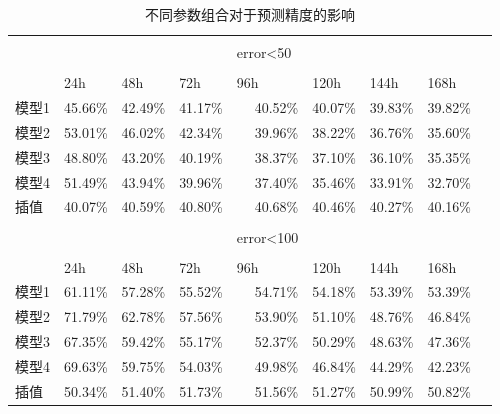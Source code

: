 \begin{table}[htbp]
  \centering
  \caption{不同参数组合对于预测精度的影响}
    \begin{tabular}{rrrrrrrrr}
    \hline \\
           &       &       &       &\multicolumn{1}{l}{error<50} &       &       &       &  \\\\
           \hline
          & \multicolumn{1}{l}{24h} & \multicolumn{1}{l}{48h} & \multicolumn{1}{l}{72h} & \multicolumn{1}{l}{96h} & \multicolumn{1}{l}{120h} & \multicolumn{1}{l}{144h} & \multicolumn{1}{l}{168h} &  \\
          \hline
    \multicolumn{1}{l}{模型1} & 45.66\% & 42.49\% & 41.17\% & 40.52\%  & 40.07\% & 39.83\% & 39.82\% &  \\
    \multicolumn{1}{l}{模型2} & 53.01\% & 46.02\% & 42.34\% & 39.96\% & 38.22\% & 36.76\% & 35.60\% &  \\
    \multicolumn{1}{l}{模型3} & 48.80\% & 43.20\% & 40.19\% & 38.37\% & 37.10\% & 36.10\% & 35.35\% &  \\
    \multicolumn{1}{l}{模型4} & 51.49\% & 43.94\% & 39.96\% & 37.40\% & 35.46\% & 33.91\% & 32.70\% &  \\
    \multicolumn{1}{l}{插值} & 40.07\% & 40.59\% & 40.80\% & 40.68\% & 40.46\% & 40.27\% & 40.16\% &  \\
    \hline
          &       &       &       &       &       &       &       &  \\
          &       &       &       &\multicolumn{1}{l}{error<100} &       &       &       &  \\ \\
          \hline
          & \multicolumn{1}{l}{24h} & \multicolumn{1}{l}{48h} & \multicolumn{1}{l}{72h} & \multicolumn{1}{l}{96h} & \multicolumn{1}{l}{120h} & \multicolumn{1}{l}{144h} & \multicolumn{1}{l}{168h} &  \\
          \hline
    \multicolumn{1}{l}{模型1} & 61.11\% & 57.28\% & 55.52\% & 54.71\% & 54.18\% & 53.39\% & 53.39\% &  \\
    \multicolumn{1}{l}{模型2} & 71.79\% & 62.78\% & 57.56\% & 53.90\% & 51.10\% & 48.76\% & 46.84\% &  \\
    \multicolumn{1}{l}{模型3} & 67.35\% & 59.42\% & 55.17\% & 52.37\% & 50.29\% & 48.63\% & 47.36\% &  \\
    \multicolumn{1}{l}{模型4} & 69.63\% & 59.75\% & 54.03\% & 49.98\% & 46.84\% & 44.29\% & 42.23\% &  \\
    \multicolumn{1}{l}{插值} & 50.34\% & 51.40\% & 51.73\% & 51.56\% & 51.27\% & 50.99\% & 50.82\% &  \\

\end{tabular}
\end{table}
